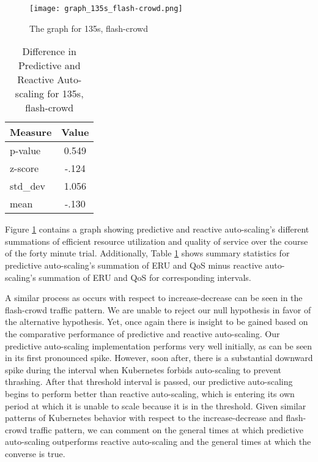 \begin{figure}[!h]
  \centerline{\texttt{[image: graph\_135s\_flash-crowd.png]}}
  \caption{The graph for 135s, flash-crowd}
  \label{fig:135s-flash-crowd}
\end{figure}

\begin{table}[htbp]
  \centering
  \caption{Difference in Predictive and Reactive Auto-scaling for 135s, flash-crowd}
  \label{tab:135s-flash-crowd}
\begin{tabular}{l c}\hline\hline
    \multicolumn{1}{c}{\textbf{Measure}} & \textbf{Value} \\ \hline
     p-value & 0.549 \\
     z-score & -.124 \\
     std\_dev & 1.056 \\
     mean & -.130
  \end{tabular}
\end{table}

Figure \ref{fig:135s-flash-crowd} contains a graph
showing predictive and reactive auto-scaling's different
summations of efficient resource utilization and quality of service over the
course of the forty minute trial. Additionally, Table
\ref{tab:135s-flash-crowd} shows summary statistics for predictive
auto-scaling's summation of ERU and QoS minus reactive auto-scaling's summation
of ERU and QoS for corresponding intervals.

A similar process as occurs with respect to increase-decrease can be seen in the
flash-crowd traffic pattern. We are unable to reject our null hypothesis in
favor of the alternative hypothesis. Yet, once again there is insight to be
gained based on the comparative performance of predictive and reactive
auto-scaling. Our predictive auto-scaling implementation performs
very well initially, as can be seen in its first pronounced spike. However, soon
after, there is a substantial downward spike during the interval when Kubernetes
forbids auto-scaling to prevent thrashing. After that threshold interval is
passed, our predictive auto-scaling begins to perform better than reactive
auto-scaling, which is entering its own period at which it is unable to scale
because it is in the threshold. Given similar patterns of Kubernetes behavior
with respect to the increase-decrease and flash-crowd traffic pattern, we can
comment on the general times at which predictive auto-scaling outperforms
reactive auto-scaling and the general times at which the converse is true.
